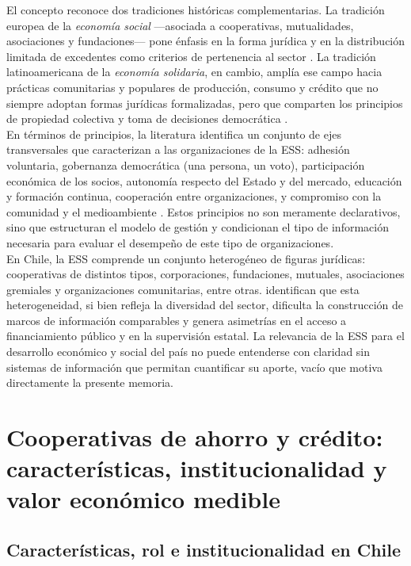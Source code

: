 El concepto reconoce dos tradiciones históricas complementarias. La tradición europea 
de la \textit{economía social} ---asociada a cooperativas, mutualidades, asociaciones 
y fundaciones--- pone énfasis en la forma jurídica y en la distribución limitada de 
excedentes como criterios de pertenencia al sector \cite{barea_tejeiro_manual_2007}. La 
tradición latinoamericana de la \textit{economía solidaria}, en cambio, amplía ese 
campo hacia prácticas comunitarias y populares de producción, consumo y crédito que 
no siempre adoptan formas jurídicas formalizadas, pero que comparten los principios 
de propiedad colectiva y toma de decisiones democrática 
.\\

En términos de principios, la literatura identifica un conjunto de ejes transversales 
que caracterizan a las organizaciones de la ESS: adhesión voluntaria, gobernanza 
democrática (una persona, un voto), participación económica de los socios, autonomía 
respecto del Estado y del mercado, educación y formación continua, cooperación entre 
organizaciones, y compromiso con la comunidad y el medioambiente 
\cite{barea_tejeiro_manual_2007}. Estos principios no son meramente declarativos, sino que 
estructuran el modelo de gestión y condicionan el tipo de información necesaria para 
evaluar el desempeño de este tipo de organizaciones.\\

En Chile, la ESS comprende un conjunto heterogéneo de figuras jurídicas: cooperativas 
de distintos tipos, corporaciones, fundaciones, mutuales, asociaciones gremiales y 
organizaciones comunitarias, entre otras.  
identifican que esta heterogeneidad, si bien refleja la diversidad del sector, dificulta 
la construcción de marcos de información comparables y genera asimetrías en el acceso 
a financiamiento público y en la supervisión estatal. La relevancia de la ESS para el 
desarrollo económico y social del país no puede entenderse con claridad sin sistemas 
de información que permitan cuantificar su aporte, vacío que motiva directamente la 
presente memoria.

 
\section{Cooperativas de ahorro y crédito: características, institucionalidad 
y valor económico medible}
\label{sec:cac}
\subsection{Características, rol e institucionalidad en Chile}

